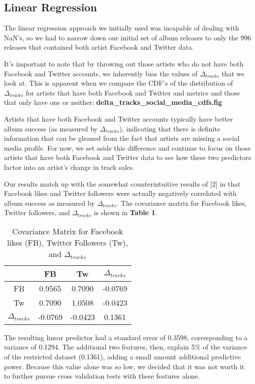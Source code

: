 \documentclass[conference]{IEEEtran}
\begin{document}
\subsection{Linear Regression}
The linear regression approach we initially used was incapable of dealing with NaN's, so we had to narrow down our initial set of album releases to only the 996 releases that contained both artist Facebook and Twitter data.

It's important to note that by throwing out those artists who do not have both Facebook and Twitter accounts, we inherently bias the values of $\Delta_{tracks}$ that we look at. This is apparent when we compare the CDF's of the distribution of $\Delta_{tracks}$ for artists that have both Facebook and Twitter and metrics and those that only have one or neither: \textbf{delta\_tracks\_social\_media\_cdfs.fig}

Artists that have both Facebook and Twitter accounts typically have better album success (as measured by $\Delta_{tracks}$), indicating that there is definite information that can be gleaned from the fact that artists are missing a social media profile. For now, we set aside this difference and continue to focus on those artists that have both Facebook and Twitter data to see how these two predictors factor into an artist's change in track sales.

Our results match up with the somewhat counterintuitive results of [2] in that Facebook likes and Twitter followers were actually negatively correlated with album success as measured by $\Delta_{tracks}$. The covariance matrix for Facebook likes, Twitter followers, and $\Delta_{tracks}$ is shown in \textbf{Table 1}.

\begin{table}[!t]
\renewcommand{\arraystretch}{1.3}
\caption{Covariance Matrix for Facebook likes (FB), Twitter Followers (Tw), and $\Delta_{tracks}$}
\label{covariance_1}
\centering
\begin{tabular}{c|ccc}
 & FB & Tw & $\Delta_{tracks}$\\
\hline
FB & 0.9565 & 0.7090 & -0.0769\\
Tw & 0.7090 & 1.0508 & -0.0423\\
$\Delta_{tracks}$ & -0.0769 & -0.0423 & 0.1361
\end{tabular}
\end{table}

The resulting linear predictor had a standard error of 0.3598, corresponding to a variance of 0.1294. The additional two features, then, explain 5\% of the variance of the restricted dataset (0.1361), adding a small amount additional predictive power. Because this value alone was so low, we decided that it was not worth it to further pursue cross validation tests with these features alone.
\end{document}
